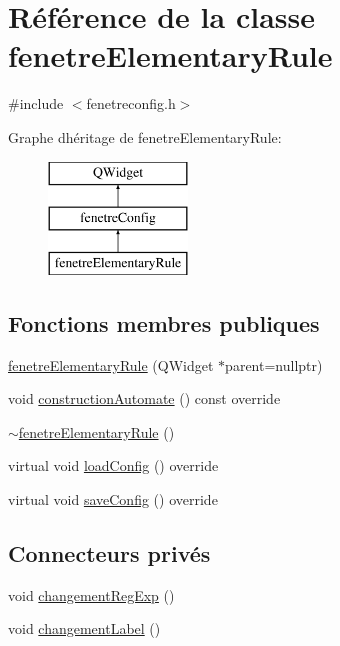 \hypertarget{classfenetre_elementary_rule}{}\section{Référence de la classe fenetre\+Elementary\+Rule}
\label{classfenetre_elementary_rule}


{\ttfamily \#include $<$fenetreconfig.\+h$>$}

Graphe d\textquotesingle{}héritage de fenetre\+Elementary\+Rule\+:\begin{figure}[H]
\begin{center}
\leavevmode
\includegraphics[height=3.000000cm]{classfenetre_elementary_rule}
\end{center}
\end{figure}
\subsection*{Fonctions membres publiques}
\begin{DoxyCompactItemize}
\item 
\mbox{\hyperlink{classfenetre_elementary_rule_a6230faa9586917afbe72a85555581da9}{fenetre\+Elementary\+Rule}} (Q\+Widget $\ast$parent=nullptr)
\item 
void \mbox{\hyperlink{classfenetre_elementary_rule_a37932a84243abfe789e6d18bdeb4324f}{construction\+Automate}} () const override
\item 
\mbox{\hyperlink{classfenetre_elementary_rule_a28139807cf1f5d842ca7fadf7df494f4}{$\sim$fenetre\+Elementary\+Rule}} ()
\item 
virtual void \mbox{\hyperlink{classfenetre_elementary_rule_affa7e46edbb21d5ef745957aab91daab}{load\+Config}} () override
\item 
virtual void \mbox{\hyperlink{classfenetre_elementary_rule_a36f7a8541be65aa1488fe251b0a6d277}{save\+Config}} () override
\end{DoxyCompactItemize}
\subsection*{Connecteurs privés}
\begin{DoxyCompactItemize}
\item 
void \mbox{\hyperlink{classfenetre_elementary_rule_ab662e4e95dd973b399b9fc0182f80c8c}{changement\+Reg\+Exp}} ()
\item 
void \mbox{\hyperlink{classfenetre_elementary_rule_a7f6fed3ef71ae9a0d2264477690d3908}{changement\+Label}} ()
\end{DoxyCompactItemize}
